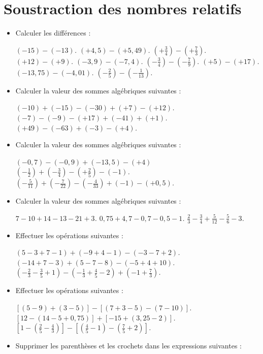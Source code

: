 \chapter{Soustraction des nombres relatifs}


\begin{itemize}
\item Calculer les différences : 
\begin{itemize}
\it $(-15)-(-13)$.
\it $(+4,5)-(+5,49)$. 
\it $\left(+\frac34\right)-\left(+\frac73\right).$
\it $(+12)-(+9)$.
\it $(-3,9)-(-7,4)$.
\it $\left(-\frac34\right)-\left(-\frac79\right).$
\it $(+5)-(+17)$.
\it $(-13,75)-(-4,01)$. 
\it $\left(-\frac25\right)-\left(-\frac1{13}\right)$.
\end{itemize}
\item Calculer la valeur des sommes algébriques suivantes : 
\begin{itemize}
\it $(-10)+(-15)-(-30)+(+7)-(+12)$.
\it $(-7)-(-9)-(+17)+(-41)+(+1)$.
\it $(+49)-(-63)+(-3)-(+4)$.
\end{itemize}
\item Calculer la valeur des sommes algébriques suivantes : 
\begin{itemize}
\it $(-0,7)-(-0,9)+(-13,5)-(+4)$
\it $\left(-\frac12\right)+\left(-\frac34\right) - \left(+\frac25\right)-(-1)$.
\it $\left(-\frac5{11}\right)+\left(-\frac7{22}\right)
-\left(-\frac4{33}\right) + (-1) -(+0,5)$.
\end{itemize}
\item Calculer la valeur des sommes algébriques suivantes : 
\begin{itemize}
\it $7-10+14-13-21+3$.
\it $0,75+4,7-0,7-0,5-1$.
\it $\frac23-\frac34+\frac5{12}-\frac56 - 3$. 
\end{itemize}
\item Effectuer les opérations suivantes : 
\begin{itemize}
\it $(5-3+7-1)+(-9+4-1)-(-3-7+2)$.
\it $(-14+7-3)+(5-7-8)-(-5+4+10)$.
\it $\left(-\frac23-\frac35+1\right) - \left(-\frac13+\frac45-2\right) + \left(-1+\frac73\right)$.
\end{itemize}
\item Effectuer les opérations suivantes : 
\begin{itemize}
\it $[(5-9)+(3-5)] - [(7+3-5) - (7-10)]$.
\it $[12-(14-5+0,75)] + [-15 + (3,25-2)]$.
\it $\left[1 - \left(\frac25-\frac43\right)\right] - 
\left[ \left(\frac45-1\right) - \left(\frac75+2\right)\right]$. 
\end{itemize}
\item Supprimer les parenthèses et les crochets dans les expressions suivantes : 

\end{itemize}

